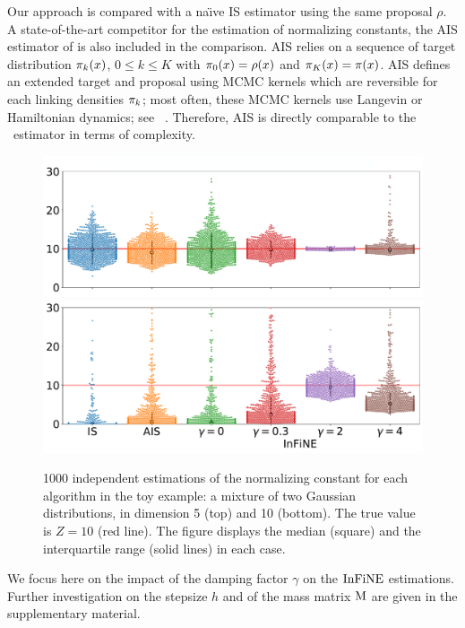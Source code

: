 \documentclass{article}
\begin{document}
Our approach is compared with a na{\"\i}ve IS estimator using the same proposal $\rho$. %
A state-of-the-art competitor for the estimation of normalizing constants, the AIS estimator of \cite{neal:2001,tokdar2010importance} is also included in the comparison.
AIS relies on a sequence of target distribution $\pi_k(x)$, $0 \leq k \leq K$ with $\pi_0(x)= \rho(x)$ and $\pi_K(x)= \pi(x)$. AIS defines an extended target and proposal using MCMC kernels which are reversible for each linking densities $\pi_k$; most often, these MCMC kernels use Langevin or Hamiltonian dynamics; see \eg\ \cite{buchholz2021adaptive}. Therefore, AIS is directly comparable to the \IFIS\ estimator in terms of complexity.
\begin{figure}[!ht]
    \centering
    \includegraphics[width= \linewidth]{pics/boxplot_two_gaussian_dim_5.pdf}
    \includegraphics[width= \linewidth]{pics/boxplot_two_gaussian_dim_10.pdf}
    \caption{1000 independent estimations of the normalizing constant for each algorithm in the toy example:  a mixture of two Gaussian distributions, in dimension 5 (top) and 10 (bottom). The true value is $Z=10$ (red line). The figure displays the median (square) and the interquartile range (solid lines) in each case.}
    \label{fig:simple_gauss}
\end{figure}
We focus here on the impact of the damping factor $\gamma$ on the $\operatorname{InFiNE}$ estimations.
Further investigation on the stepsize $h$ and of the mass matrix $\mathrm{M}$  are given in the supplementary material.
\end{document}
